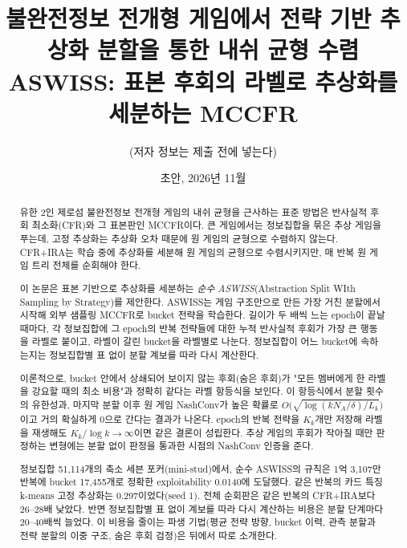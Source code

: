 \documentclass[11pt,a4paper]{article}
\title{불완전정보 전개형 게임에서 전략 기반 추상화 분할을 통한 내쉬 균형 수렴\\[4pt]
\large ASWISS: 표본 후회의 라벨로 추상화를 세분하는 MCCFR}
\author{(저자 정보는 제출 전에 넣는다)}
\date{초안, 2026년 11월}
\theoremstyle{plain}
\theoremstyle{definition}
\theoremstyle{remark}
\begin{document}
\maketitle

\begin{abstract}
유한 2인 제로섬 불완전정보 전개형 게임의 내쉬 균형을 근사하는 표준 방법은 반사실적 후회 최소화(CFR)와 그 표본판인 MCCFR이다.
큰 게임에서는 정보집합을 묶은 추상 게임을 푸는데, 고정 추상화는 추상화 오차 때문에 원 게임의 균형으로 수렴하지 않는다.
CFR+IRA는 학습 중에 추상화를 세분해 원 게임의 균형으로 수렴시키지만, 매 반복 원 게임 트리 전체를 순회해야 한다.

이 논문은 표본 기반으로 추상화를 세분하는 \emph{순수 ASWISS}(Abstraction Split WIth Sampling by Strategy)를 제안한다.
ASWISS는 게임 구조만으로 만든 가장 거친 분할에서 시작해 외부 샘플링 MCCFR로 bucket 전략을 학습한다.
길이가 두 배씩 느는 epoch이 끝날 때마다, 각 정보집합에 그 epoch의 반복 전략들에 대한 누적 반사실적 후회가 가장 큰 행동을 라벨로 붙이고, 라벨이 갈린 bucket을 라벨별로 나눈다.
정보집합이 어느 bucket에 속하는지는 정보집합별 표 없이 분할 계보를 따라 다시 계산한다.

이론적으로, bucket 안에서 상쇄되어 보이지 않는 후회(숨은 후회)가 "모든 멤버에게 한 라벨을 강요할 때의 최소 비용"과 정확히 같다는 라벨 항등식을 보인다.
이 항등식에서 분할 횟수의 유한성과, 마지막 분할 이후 원 게임 NashConv가 높은 확률로 $O\big(\sqrt{\log(kN_A/\delta)/L_k}\big)$이고 거의 확실하게 0으로 간다는 결과가 나온다.
epoch의 반복 전략을 $K_k$개만 저장해 라벨을 재생해도 $K_k/\log k\to\infty$이면 같은 결론이 성립한다.
추상 게임의 후회가 작아질 때만 판정하는 변형에는 분할 없이 판정을 통과한 시점의 NashConv 인증을 준다.

정보집합 51,114개의 축소 세븐 포커(mini-stud)에서, 순수 ASWISS의 규칙은 1억 3,107만 반복에 bucket 17,455개로 정확한 exploitability 0.0140에 도달했다. 같은 반복의 카드 특징 k-means 고정 추상화는 0.297이었다(seed 1).
전체 순회판은 같은 반복의 CFR+IRA보다 26–28배 낮았다.
반면 정보집합별 표 없이 계보를 따라 다시 계산하는 비용은 분할 단계마다 20–40배씩 늘었다.
이 비용을 줄이는 파생 기법(평균 전략 방향, bucket 이력, 관측 분할과 전략 분할의 이중 구조, 숨은 후회 검정)은 뒤에서 따로 소개한다.
\end{abstract}

\tableofcontents
\clearpage














\appendix


\end{document}
